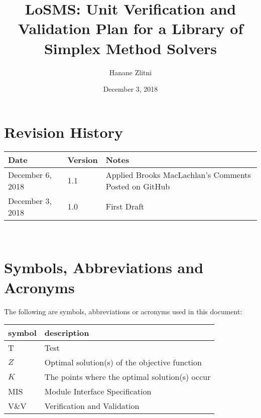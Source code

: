 \documentclass[12pt, titlepage]{article}
\newcommand{\progname}{Library of Simplex Method Solvers}
\newcommand{\famname}{LoSMS}
\begin{document}
\title{\famname{}: Unit Verification and Validation Plan for a \progname{}} 
\author{Hanane Zlitni}
\date{December 3, 2018}
	
\maketitle


\section{Revision History}

\begin{tabularx}{\textwidth}{p{3cm}p{2cm}X}
\toprule {\bf Date} & {\bf Version} & {\bf Notes}\\
\midrule
December 6, 2018 & 1.1 & Applied Brooks MacLachlan's Comments Posted on GitHub\\
December 3, 2018 & 1.0 & First Draft\\
\bottomrule
\end{tabularx}

~\newpage

\tableofcontents

\listoftables

\newpage

\section{Symbols, Abbreviations and Acronyms}

The following are symbols, abbreviations or acronyms used in this document: \\

\renewcommand{\arraystretch}{1.2}
\begin{tabular}{l l} 
  \toprule		
  \textbf{symbol} & \textbf{description}\\
  \midrule 
  T & Test\\
  $Z$ & Optimal solution(s) of the objective function\\
  $K$ & The points where the optimal solution(s) occur\\
  MIS & Module Interface Specification\\
  V\&V & Verification and Validation\\
  \bottomrule
\end{tabular}\\

\newpage

\end{document}

